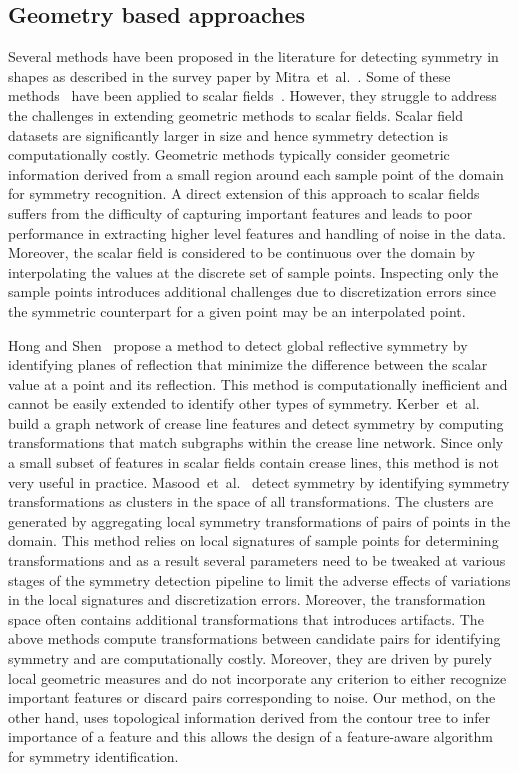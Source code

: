 \documentclass[review,journal]{vgtc}         %
\begin{document}
\subsection{Geometry based approaches}
Several methods have been proposed in the literature for detecting
symmetry in shapes as described in the survey paper by
Mitra~et~al.~\cite{MitPWC2012}. Some of these methods~\cite{Mitra06,KazhdanCDFR03,BokBWSS09} have 
been applied to scalar fields~\cite{MasoodTN13,HongS08,kerbWKS11}. However, they struggle to address 
the challenges in extending geometric methods to scalar fields.
Scalar field datasets are significantly larger in size and hence symmetry detection is computationally costly.
Geometric methods typically consider geometric information derived from a small region around each sample
point of the domain for symmetry recognition. A direct extension of this approach to scalar fields
suffers from the difficulty of capturing important features and leads to poor performance 
in extracting higher level features and handling of noise in the data.
Moreover, the scalar field is considered to be continuous over the domain by interpolating the values at 
the discrete set of sample points. Inspecting only the sample points
introduces additional challenges due to discretization errors since the symmetric counterpart for a 
given point may be an interpolated point.

Hong and Shen~\cite{HongS08} propose a method to detect global reflective symmetry by identifying planes
of reflection that minimize the difference between the scalar value at a point and its
reflection. This method is computationally inefficient and cannot be easily extended to identify 
other types of symmetry. Kerber~et~al.~\cite{kerbWKS11} build a graph network of crease line features 
and detect symmetry by computing transformations that match subgraphs within the crease line network.
Since only a small subset of features in scalar fields contain crease lines, 
this method is not very useful in practice. Masood~et~al.~\cite{MasoodTN13} detect
symmetry by identifying symmetry transformations as clusters in the space of all transformations.
The clusters are generated by aggregating local symmetry transformations of pairs of points in the 
domain. This method relies on local signatures of sample points for determining 
transformations and as a result several parameters need to be tweaked at various stages of 
the symmetry detection pipeline to limit the adverse effects of variations in the local signatures 
and discretization errors.  Moreover, the transformation space often contains additional transformations
that introduces artifacts. The above methods compute transformations between 
candidate pairs for identifying symmetry and are computationally costly. Moreover, they 
are driven by purely local geometric measures and do not incorporate any criterion 
to either recognize important features or discard pairs corresponding to noise. 
Our method, on the other hand, uses topological information derived from the contour tree to infer 
importance of a feature and this allows the design of a feature-aware algorithm for symmetry identification. 
\end{document}
